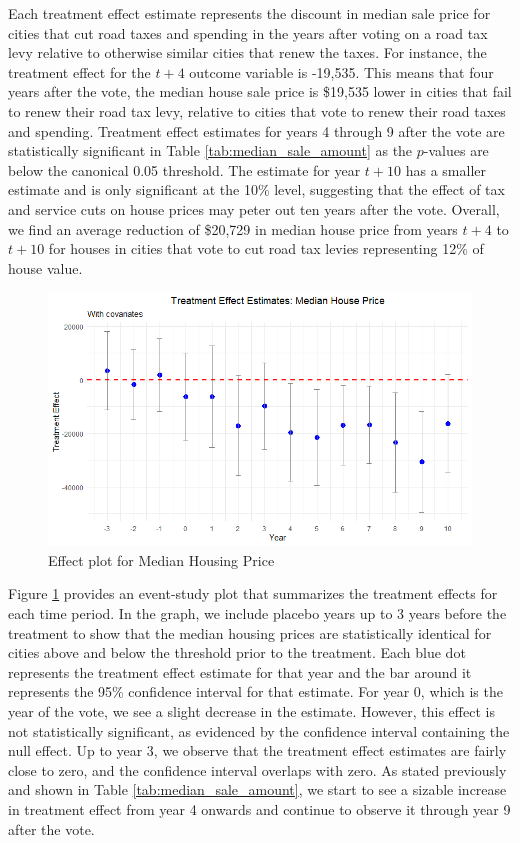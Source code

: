 Each treatment effect estimate represents the discount in median sale price for cities that cut road taxes and spending in the years after voting on a road tax levy relative to otherwise similar cities that renew the taxes. For instance, the treatment effect for the $t + 4$ outcome variable is -19,535.  This means that four years after the vote, the median house sale price is \$19,535 lower in cities that fail to renew their road tax levy, relative to cities that vote to renew their road taxes and spending. Treatment effect estimates for years 4 through 9 after the vote are statistically significant in Table \ref{tab:median_sale_amount} as the $p$-values are below the canonical 0.05 threshold.  The estimate for year $t + 10$ has a smaller estimate and is only significant at the 10\% level, suggesting that the effect of tax and service cuts on house prices may peter out ten years after the vote. Overall, we find an average reduction of \$20,729 in median house price from years $t+4$ to $t+10$ for houses in cities that vote to cut road tax levies representing 12\% of house value.

\begin{figure}[htbp]
    \centering
    \includegraphics[width=\textwidth,keepaspectratio]{images/tes_gs.png}
    \caption{Effect plot for Median Housing Price}
    \label{fig:tes_hp}
\end{figure}

Figure \ref{fig:tes_hp} provides an event-study plot that summarizes the treatment effects for each time period. In the graph, we include placebo years up to 3 years before the treatment to show that the median housing prices are statistically identical for cities above and below the threshold prior to the treatment. Each blue dot represents the treatment effect estimate for that year and the bar around it represents the 95\% confidence interval for that estimate. For year 0, which is the year of the vote, we see a slight decrease in the estimate. However, this effect is not statistically significant, as evidenced by the confidence interval containing the null effect. Up to year 3, we observe that the treatment effect estimates are fairly close to zero, and the confidence interval overlaps with zero. As stated previously and shown in Table \ref{tab:median_sale_amount}, we start to see a sizable increase in treatment effect from year 4 onwards and continue to observe it through year 9 after the vote. 

